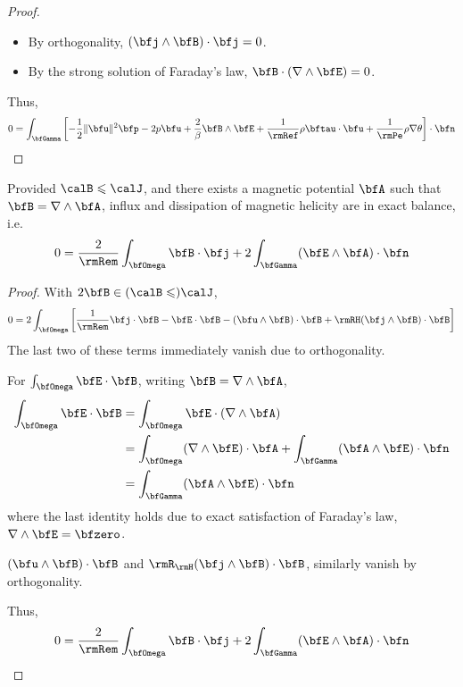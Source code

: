 \begin{proof}
\begin{itemize}
                \item  By orthogonality, $(\bfj\wedge\bfB)\cdot\bfj  =  0$.
                \item  By the strong solution of Faraday's law, $\bfB\cdot(\nabla\wedge\bfE)  =  0$.
            \end{itemize}
            Thus,
            \begin{equation}
                0  =  \int_{\bfGamma}\left[- \frac{1}{2}\|\bfu\|^{2}\bfp - 2p\bfu + \frac{2}{\beta}\bfB\wedge\bfE + \frac{1}{\rmRef}\rho\bftau\cdot\bfu + \frac{1}{\rmPe}\rho\nabla\theta\right]\cdot\bfn
            \end{equation}
        \end{proof}
        
        \begin{theorem*}
            Provided $\calB  \leqslant  \calJ$, and there exists a magnetic potential $\bfA$ such that $\bfB  =  \nabla\wedge\bfA$, influx and dissipation  of magnetic helicity are in exact balance, i.e.
            \begin{equation}
                0  =  \frac{2}{\rmRem}\int_{\bfOmega}\bfB\cdot\bfj + 2\int_{\bfGamma}(\bfE\wedge\bfA)\cdot\bfn
            \end{equation}
        \end{theorem*}
        \begin{proof}
            With $2\bfB  \in  (\calB  \leqslant)  \calJ$,
            \begin{align}
                0  =  2\int_{\bfOmega}\left[\frac{1}{\rmRem}\bfj\cdot\bfB - \bfE\cdot\bfB - (\bfu\wedge\bfB)\cdot\bfB + \rmRH(\bfj\wedge\bfB)\cdot\bfB\right]
            \end{align}
            The last two of these terms immediately vanish due to orthogonality.
            
            For $\int_{\bfOmega}\bfE\cdot\bfB$, writing $\bfB  =  \nabla\wedge\bfA$,
            \begin{align}
                \int_{\bfOmega}\bfE\cdot\bfB  &=  \int_{\bfOmega}\bfE\cdot(\nabla\wedge\bfA)  \\
                &=  \int_{\bfOmega}(\nabla\wedge\bfE)\cdot\bfA + \int_{\bfGamma}(\bfA\wedge\bfE)\cdot\bfn  \\
                &=  \int_{\bfGamma}(\bfA\wedge\bfE)\cdot\bfn
            \end{align}
            where the last identity holds due to exact satisfaction of Faraday's law, $\nabla\wedge\bfE  =  \bfzero$.

            $(\bfu\wedge\bfB)\cdot\bfB$ and $\rmR_{\rmH}(\bfj\wedge\bfB)\cdot\bfB$, similarly vanish by orthogonality. 
            
            Thus,
            \begin{equation}
                0  =  \frac{2}{\rmRem}\int_{\bfOmega}\bfB\cdot\bfj + 2\int_{\bfGamma}(\bfE\wedge\bfA)\cdot\bfn
            \end{equation}
        \end{proof}
        
